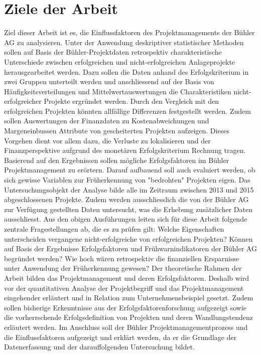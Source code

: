 \section{Ziele der Arbeit}\label{sec:zda}
Ziel dieser Arbeit ist es, die Einflussfaktoren des Projektmanagements der Bühler AG zu analysieren. Unter der Anwendung deskriptiver statistischer Methoden sollen auf Basis der Bühler-Projektdaten retrospektiv charakteristische Unterschiede zwischen erfolgreichen und nicht-erfolgreichen Anlageprojekte herausgearbeitet werden. Dazu sollen die Daten anhand des Erfolgskriterium in zwei Gruppen unterteilt werden und anschliessend auf der Basis von Häufigkeitsverteilungen und Mittelwertauswertungen die Charakteristiken nicht-erfolgreicher Projekte ergründet werden. Durch den Vergleich mit den erfolgreichen Projekten könnten allfällige Differenzen festgestellt werden. Zudem sollen Auswertungen der Finanzdaten zu Kostenabweichungen und Margeneinbussen Attribute von gescheiterten Projekten aufzeigen. Dieses Vorgehen dient vor allem dazu, die Verluste zu \glqq lokalisieren\grqq{} und der Finanzperspektive aufgrund des monetären Erfolgskriterium Rechnung tragen. Basierend auf den Ergebnissen sollen mögliche Erfolgsfaktoren im Bühler Projektmanagement zu erörtern. Darauf aufbauend soll auch evaluiert werden, ob sich gewisse Variablen zur Früherkennung von "bedrohten" Projekten eigen. Das Untersuchungsobjekt der Analyse bilde alle im Zeitraum zwischen 2013 und 2015 abgeschlossenen Projekte. Zudem werden ausschliesslich die von der Bühler AG zur Verfügung gestellten Daten untersucht, was die Erhebung zusätzlicher Daten ausschliesst. Aus den obigen Ausführungen leiten sich für diese Arbeit folgende zentrale Fragestellungen ab, die es zu prüfen gilt:
\newline\newline
Welche Eigenschaften unterscheiden vergangene nicht-erfolgreiche von erfolgreichen Projekten? Können auf Basis der Ergebnisse Erfolgsfaktoren und Frühwarnindikatoren der Bühler AG begründet werden? Wie hoch wären retrospektiv die finanziellen Ersparnisse unter Anwendung der Früherkennung gewesen?
\newline\newline
Der theoretische Rahmen der Arbeit bilden das Projektmanagement und deren Erfolgsfaktoren. Deshalb wird vor 
der quantitativen Analyse der Projektbegriff und das Projektmanagement eingehender erläutert und in Relation zum Unternehmensbeispiel gesetzt. Zudem sollen bisherige Erkenntnisse aus der Erfolgsfaktorenforschung aufgezeigt sowie die vorherrschende Erfolgsdefinition von Projekten und deren Wandlungstendenz erläutert werden. Im Anschluss soll der Bühler Projektmanagementprozess und die Einflussfaktoren aufgezeigt und erklärt werden, da er die Grundlage der Datenerfassung und der darauffolgenden Untersuchung bildet. 

